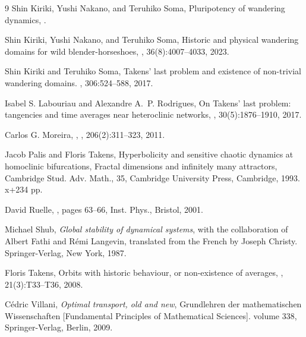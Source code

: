 \documentclass{amsart}
\theoremstyle{plain}
\theoremstyle{definition}
\numberwithin{equation}{section}
\numberwithin{figure}{section}
\begin{document}
\begin{thebibliography}{9}
Shin Kiriki, Yushi Nakano, and Teruhiko Soma, 
\newblock Pluripotency of wandering dynamics, 
.


Shin Kiriki, Yushi Nakano, and Teruhiko Soma, 
\newblock Historic and physical wandering domains for wild blender-horseshoes, 
, 36(8):4007--4033, 2023.


Shin Kiriki and Teruhiko Soma, 
\newblock Takens' last problem and existence of non-trivial wandering domains.
, 306:524--588, 2017.


Isabel S. Labouriau and Alexandre A.~P. Rodrigues, 
\newblock On {T}akens' last problem: tangencies and time averages near
  heteroclinic networks, 
, 30(5):1876--1910, 2017.


Carlos G. Moreira,
,
, 206(2):311--323, 2011.


Jacob Palis and Floris Takens, 
Hyperbolicity and sensitive chaotic dynamics at homoclinic bifurcations, 
Fractal dimensions and infinitely many attractors, 
Cambridge Stud. Adv. Math., 35, 
Cambridge University Press, Cambridge, 1993. x+234 pp.


David Ruelle, 
, pages 63--66, 
\newblock Inst. Phys., Bristol, 2001.


Michael Shub,
{\em Global stability of dynamical systems}, 
with the collaboration of Albert Fathi and R\'emi Langevin, 
translated from the French by Joseph Christy.
Springer-Verlag, New York,  1987.



Floris Takens, 
\newblock Orbits with historic behaviour, or non-existence of averages, 
, 21(3):T33--T36, 2008.


C\'edric Villani, 
{\em Optimal transport, old and new},
 Grundlehren der mathematischen Wissenschaften [Fundamental  Principles of Mathematical Sciences].  volume 338, 
Springer-Verlag, Berlin, 2009.



\end{thebibliography}
\end{document}
